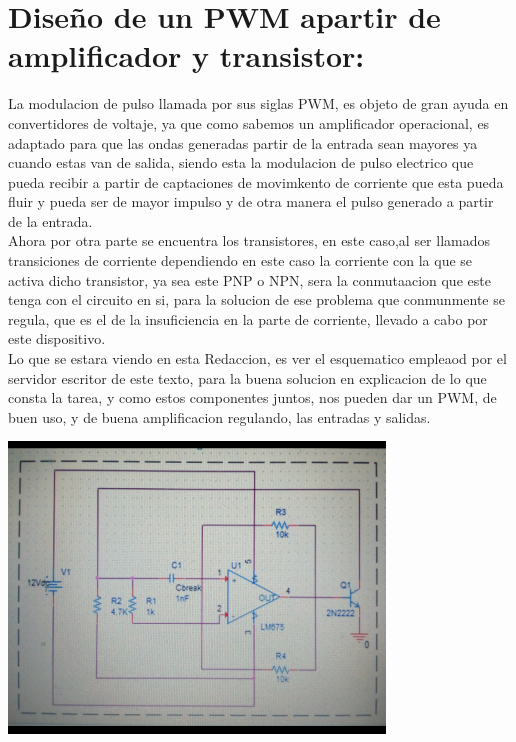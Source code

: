 \documentclass[12pt,a4paper]{article}
\begin{document}
\section{Diseño de un PWM apartir de amplificador y transistor:}

La modulacion de pulso llamada por sus siglas PWM, es objeto de gran ayuda en convertidores de voltaje, ya que como sabemos un amplificador operacional, es adaptado para que las ondas generadas  partir de la entrada sean mayores ya cuando estas van de salida, siendo esta la modulacion de pulso electrico que pueda recibir a partir de captaciones de movimkento de corriente que esta pueda fluir y pueda ser de mayor impulso y de otra manera el pulso generado a partir de la entrada.\\

Ahora por otra parte se encuentra los transistores, en este caso,al ser llamados transiciones de corriente dependiendo en este caso la corriente con la que se activa dicho transistor, ya sea este PNP o NPN, sera la conmutaacion que este tenga con el circuito en si, para la solucion de ese problema que conmunmente se regula, que es el de la insuficiencia en la parte de corriente, llevado a cabo por este dispositivo.\\

Lo que se estara viendo en esta Redaccion, es ver el esquematico empleaod por el servidor escritor de este texto, para la buena solucion en explicacion de lo que consta la tarea, y como estos componentes juntos, nos pueden dar un PWM, de buen uso, y de buena amplificacion regulando, las entradas y salidas.\\

\begin{center}
\includegraphics[width=10cm]{diagrama.png} 
\end{center}
\end{document}

